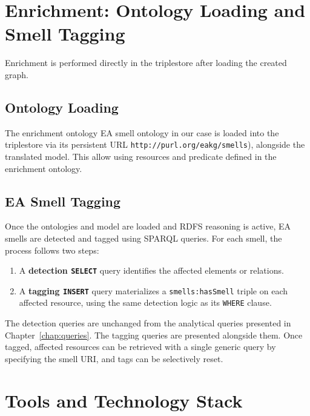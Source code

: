 \section{Enrichment: Ontology Loading and Smell Tagging}
\label{sec:enrichment}

Enrichment is performed directly in the triplestore after loading the created graph.

\subsection{Ontology Loading}
\label{subsec:ontology-loading}

The enrichment ontology EA smell ontology in our case is loaded into the triplestore via its persistent URL \texttt{http://purl.org/eakg/smells}), alongside the translated model. This allow using resources and predicate defined in the enrichment ontology.

\subsection{EA Smell Tagging}
\label{subsec:smell-tagging}

Once the ontologies and model are loaded and RDFS reasoning is active, EA smells are detected and tagged using SPARQL queries. For each smell, the process follows two steps:

\begin{enumerate}
    \item A \textbf{detection \texttt{SELECT}} query identifies the affected elements or relations.
    \item A \textbf{tagging \texttt{INSERT}} query materializes a \texttt{smells:hasSmell} triple on each affected resource, using the same detection logic as its \texttt{WHERE} clause.
\end{enumerate}

The detection queries are unchanged from the analytical queries presented in Chapter~\ref{chap:queries}. The tagging queries are presented alongside them. Once tagged, affected resources can be retrieved with a single generic query by specifying the smell URI, and tags can be selectively reset.

\section{Tools and Technology Stack}
\label{sec:tools}

